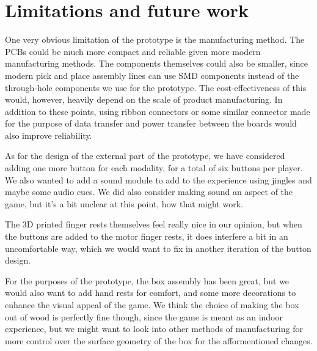 \documentclass[acmsmall]{acmart}
\begin{document}
\section{Limitations and future work}
One very obvious limitation of the prototype is the manufacturing method. The PCBs could be much more compact and reliable 
given more modern manufacturing methods. The components themselves could also be smaller, since modern pick and place assembly lines 
can use SMD components instead of the through-hole components we use for the prototype. The cost-effectiveness of this would,
however, heavily depend on the scale of product manufacturing. In addition to these points, using ribbon connectors or some similar 
connector made for the purpose of data transfer and power transfer between the boards would also improve reliability. 

As for the design of the external part of the prototype, we have considered adding one more button for each modality, for a total of six buttons 
per player. We also wanted to add a sound module to add to the experience using jingles and maybe some audio cues. We did also consider making sound 
an aspect of the game, but it's a bit unclear at this point, how that might work.

The 3D printed finger rests themselves feel really nice in our opinion, but when the buttons are added to the motor finger rests, it 
does interfere a bit in an uncomfortable way, which we would want to fix in another iteration of the button design.

For the purposes of the prototype, the box assembly has been great, but we would also want to add hand rests for comfort, and some more decorations
to enhance the visual appeal of the game. We think the choice of making the box out of wood is perfectly fine though, since the game 
is meant as an indoor experience, but we might want to look into other methods of manufacturing for more control over the 
surface geometry of the box for the afformentioned changes.
\end{document}
